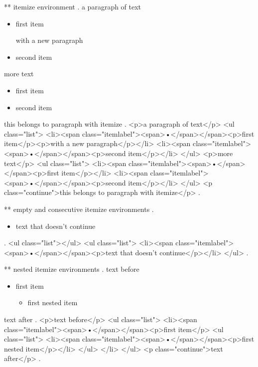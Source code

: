** itemize environment
.
a paragraph of text

\begin{itemize}
    \item first item

        with a new paragraph
    \item second item
\end{itemize}
%

more text

\begin{itemize}
    \item first item
    \item second item
\end{itemize}
this belongs to paragraph with itemize
.
<p>a paragraph of text</p>
<ul class="list">
<li><span class="itemlabel"><span>•</span></span><p>ﬁrst item</p><p>with a new paragraph</p></li>
<li><span class="itemlabel"><span>•</span></span><p>second item</p></li>
</ul>
<p>more text</p>
<ul class="list">
<li><span class="itemlabel"><span>•</span></span><p>ﬁrst item</p></li>
<li><span class="itemlabel"><span>•</span></span><p>second item</p></li>
</ul>
<p class="continue">this belongs to paragraph with itemize</p>
.


** empty and consecutive itemize environments
.
\begin{itemize}
\end{itemize}
\begin{itemize}
    \item text that doesn't continue
\end{itemize}
.
<ul class="list"></ul>
<ul class="list">
<li><span class="itemlabel"><span>•</span></span><p>text that doesn’t continue</p></li>
</ul>
.


** nested itemize environments
.
text before
\begin{itemize}
    \item first item
        \begin{itemize}
            \item first nested item
        \end{itemize}
\end{itemize}
text after
.
<p>text before</p>
<ul class="list">
<li><span class="itemlabel"><span>•</span></span><p>ﬁrst item</p>
<ul class="list">
<li><span class="itemlabel"><span>•</span></span><p>ﬁrst nested item</p></li>
</ul>
</li>
</ul>
<p class="continue">text after</p>
.


